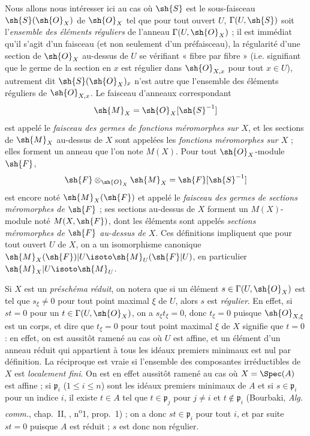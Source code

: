 \begin{env}[20.1.3]
\label{IV.20.1.3}
Nous allons nous intéresser ici au cas où $\sh{S}$ est le sous-faisceau $\sh{S}(\sh{O}_X)$ de $\sh{O}_X$ tel que pour tout ouvert $U$, $\Gamma(U,\sh{S})$ soit l'\emph{ensemble des éléments réguliers} de l'anneau $\Gamma(U,\sh{O}_X)$ ; il est immédiat qu'il s'agit d'un faisceau (et non seulement d'un préfaisceau), la régularité d'une section de $\sh{O}_X$ au-dessus de $U$ se vérifiant « fibre par fibre » (i.e. signifiant que le germe de la section en $x$ est régulier dans $\sh{O}_{X,x}$ pour tout $x\in U$), autrement dit $\sh{S}(\sh{O}_X)_x$ n'est autre que l'ensemble des éléments réguliers de $\sh{O}_{X,x}$.
Le faisceau d'anneaux correspondant
\[
  \sh{M}_X=\sh{O}_X[\sh{S}^{-1}]
\]
est appelé le \emph{faisceau des germes de fonctions méromorphes sur $X$}, et les sections de $\sh{M}_X$ au-dessus de $X$ sont appelées les \emph{fonctions méromorphes sur $X$} ; elles forment un anneau que l'on note $M(X)$.
Pour tout $\sh{O}_X$-module $\sh{F}$,
\[
  \sh{F}\otimes_{\sh{O}_X}\sh{M}_X=\sh{F}[\sh{S}^{-1}]
\]
est encore noté $\sh{M}_X(\sh{F})$ et appelé le \emph{faisceau des germes de sections méromorphes de $\sh{F}$} ; ses sections au-dessus de $X$ forment un $M(X)$-module noté $M(X,\sh{F})$, dont les éléments sont appelés \emph{sections méromorphes de $\sh{F}$ au-dessus de $X$}.
Ces définitions impliquent que pour tout ouvert $U$ de $X$, on a un isomorphisme canonique $\sh{M}_X(\sh{F})|U\isoto\sh{M}_U(\sh{F}|U)$, en particulier $\sh{M}_X|U\isoto\sh{M}_U$.
\end{env}

\begin{env}[20.1.3.1]
\label{IV.20.1.3.1}
Si $X$ est un \emph{préschéma réduit}, on notera que si un élément $s\in\Gamma(U,\sh{O}_X)$ est tel que $s_\xi\neq0$ pour tout point maximal $\xi$ de $U$, alors $s$ est \emph{régulier}.
En effet, si $st=0$ pour un $t\in\Gamma(U,\sh{O}_X)$, on a $s_\xi t_\xi=0$, donc $t_\xi=0$ puisque $\sh{O}_{X,\xi}$ est un corps, et dire que $t_\xi=0$ pour tout point maximal $\xi$ de $X$ signifie que $t=0$ : en effet, on est aussitôt ramené au cas où $U$ est affine, et un élément d'un anneau réduit qui appartient à tous les idéaux premiers minimaux est nul par définition.
La réciproque est vraie si l'ensemble des composantes irréductibles de $X$ est \emph{localement fini}.
On est en effet aussitôt ramené au cas où $X=\Spec(A)$ est affine ; si $\mathfrak p_i$ ($1\leq i\leq n$) sont les idéaux premiers minimaux de $A$ et si $s\in\mathfrak p_i$ pour un indice $i$, il existe $t\in A$ tel que $t\in\mathfrak p_j$ pour $j\neq i$ et $t\notin\mathfrak p_i$ (Bourbaki, \emph{Alg. comm.}, chap.~II, , n\textsuperscript{o}1, prop.~1) ; on a donc $st\in\mathfrak p_i$ pour tout $i$, et par suite $st=0$ puisque $A$ est réduit ; $s$ est donc non régulier.
\end{env}

